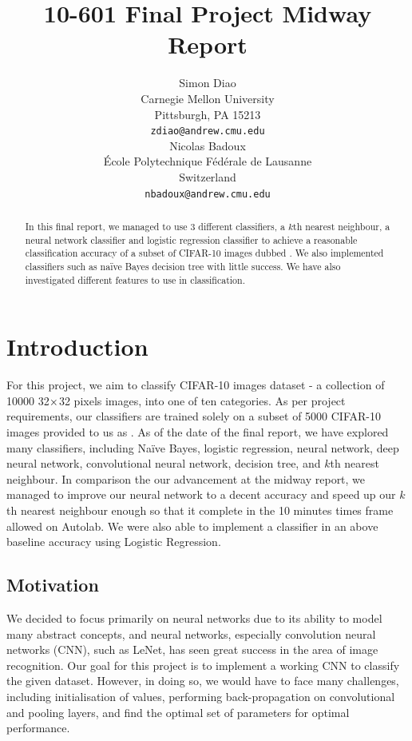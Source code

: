 \documentclass{article} %
\title{10-601 Final Project Midway Report}
\author{
Simon Diao\\
Carnegie Mellon University\\
Pittsburgh, PA 15213 \\
\texttt{zdiao@andrew.cmu.edu} \\
\And
Nicolas Badoux \\
\'Ecole Polytechnique F\'ed\'erale de Lausanne \\
Switzerland \\
\texttt{nbadoux@andrew.cmu.edu} \\
}
\begin{document}
\maketitle

\begin{abstract}
In this final report, we managed to use 3 different classifiers, a $k$th nearest neighbour, a neural network classifier and logistic regression classifier to achieve a reasonable classification accuracy of a subset of CIFAR-10 images dubbed . We also implemented classifiers such as na\"ive Bayes decision tree with little success. We have also investigated different features to use in classification.
\end{abstract}

\section{Introduction}

For this project, we aim to classify CIFAR-10 images dataset - a collection of 10000 32$\times$32 pixels images, into one of ten categories. As per project requirements,
our classifiers are trained solely on a subset of 5000 CIFAR-10 images provided to us as . As of the date of the final report, we have explored many
classifiers, including Na\"ive Bayes, logistic regression, neural network, deep neural network, convolutional neural network, decision tree, and $k$th nearest neighbour. 
In comparison the our advancement at the midway report, we managed to improve our neural network to a decent accuracy and speed up our $k$th nearest neighbour enough so that it complete in the 10 minutes times frame allowed on Autolab.  We were also able to implement a classifier in an above baseline accuracy using Logistic Regression.

\subsection{Motivation}

We decided to focus primarily on neural networks due to its ability to model many abstract concepts, and neural networks, especially convolution neural networks (CNN), such as LeNet,
has seen great success in the area of image recognition. Our goal for this project is to implement a working CNN to classify the given dataset. However, in doing so, we would have 
to face many challenges, including initialisation of values, performing back-propagation on convolutional and pooling layers, and find the optimal set of parameters for optimal
performance.
\end{document}
